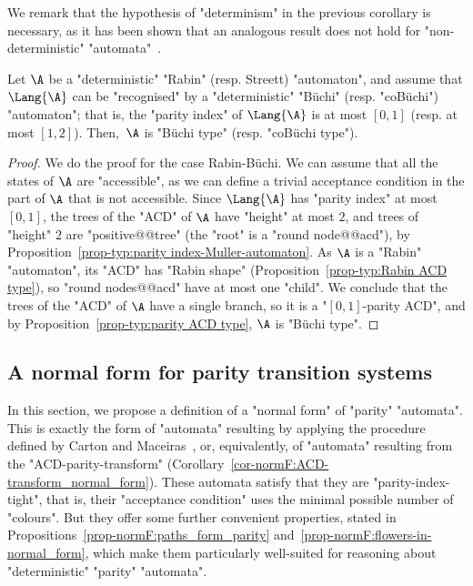 \documentclass[10pt,a4paper]{amsart}
\begin{document}
We remark that the hypothesis of "determinism" in the previous corollary is necessary, as it has been shown that an analogous result does not hold for "non-deterministic" "automata"~\cite{BKS10Paritizing}.




\begin{proposition}
	Let $\A$ be a "deterministic" "Rabin" (resp. Streett) "automaton", and assume that $\Lang{\A}$ can be "recognised" by a "deterministic" "B\"uchi" (resp. "coB\"uchi") "automaton"; that is, the "parity index" of $\Lang{\A}$ is at most $[0,1]$ (resp. at most $[1,2]$). Then,~$\A$ is "B\"uchi type" (resp. "coB\"uchi type").
\end{proposition}
\begin{proof}
	We do the proof for the case Rabin-B\"uchi. We can assume that all the states of $\A$ are "accessible", as we can define a trivial acceptance condition in the part of $\A$ that is not accessible.  Since $\Lang{\A}$ has "parity index" at most $[0,1]$, the trees of the "ACD" of $\A$ have "height" at most $2$, and trees of "height" $2$ are "positive@@tree" (the "root" is a "round node@@acd"), by Proposition~\ref{prop-typ:parity index-Muller-automaton}. As $\A$ is a "Rabin" "automaton", its "ACD" has "Rabin shape" (Proposition~\ref{prop-typ:Rabin ACD type}), so "round nodes@@acd" have at most one "child". We conclude that the trees of the "ACD" of $\A$ have a single branch, so it is a "$[0,1]$-parity ACD", and by Proposition~\ref{prop-typ:parity ACD type}, $\A$ is "B\"uchi type".
\end{proof}



\subsection{A normal form for parity transition systems}\label{subsec-corollaries: normal-form}
In this section, we propose a definition of a "normal form" of "parity" "automata". This is exactly the form of "automata" resulting by applying the procedure defined by Carton and Maceiras~\cite{CartonMaceiras99RabinIndex}, or, equivalently, of "automata" resulting from the "ACD-parity-transform" (Corollary~\ref{cor-normF:ACD-transform_normal_form}). These automata satisfy that they are "parity-index-tight", that is, their "acceptance condition" uses the minimal possible number of "colours". But they offer some further convenient properties, stated in Propositions~\ref{prop-normF:paths_form_parity} and~\ref{prop-normF:flowers-in-normal_form}, which make them particularly well-suited for reasoning about "deterministic" "parity" "automata".
\end{document}
